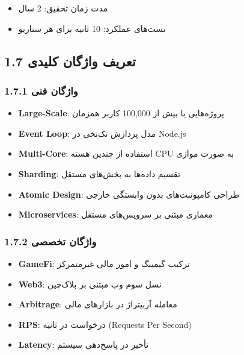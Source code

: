 \documentclass[
]{article}
\providecommand{\tightlist}{%
  \setlength{\itemsep}{0pt}\setlength{\parskip}{0pt}}
\begin{document}
\begin{itemize}
\tightlist
\item
  مدت زمان تحقیق: 2 سال
\item
  تست‌های عملکرد: 10 ثانیه برای هر سناریو
\end{itemize}

\subsection{1.7 تعریف واژگان
کلیدی}\label{ux62aux639ux631ux6ccux641-ux648ux627ux698ux6afux627ux646-ux6a9ux644ux6ccux62fux6cc}

\subsubsection{1.7.1 واژگان
فنی}\label{ux648ux627ux698ux6afux627ux646-ux641ux646ux6cc}

\begin{itemize}
\tightlist
\item
  \textbf{Large-Scale}: پروژه‌هایی با بیش از 100,000 کاربر همزمان
\item
  \textbf{Event Loop}: مدل پردازش تک‌نخی در Node.js
\item
  \textbf{Multi-Core}: استفاده از چندین هسته CPU به صورت موازی
\item
  \textbf{Sharding}: تقسیم داده‌ها به بخش‌های مستقل
\item
  \textbf{Atomic Design}: طراحی کامپوننت‌های بدون وابستگی خارجی
\item
  \textbf{Microservices}: معماری مبتنی بر سرویس‌های مستقل
\end{itemize}

\subsubsection{1.7.2 واژگان
تخصصی}\label{ux648ux627ux698ux6afux627ux646-ux62aux62eux635ux635ux6cc}

\begin{itemize}
\tightlist
\item
  \textbf{GameFi}: ترکیب گیمینگ و امور مالی غیرمتمرکز
\item
  \textbf{Web3}: نسل سوم وب مبتنی بر بلاک‌چین
\item
  \textbf{Arbitrage}: معامله آربیتراژ در بازارهای مالی
\item
  \textbf{RPS}: درخواست در ثانیه (Requests Per Second)
\item
  \textbf{Latency}: تأخیر در پاسخ‌دهی سیستم
\end{itemize}
\end{document}
